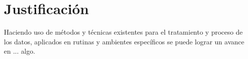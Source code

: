 \section{Justificación}

Haciendo uso de métodos y técnicas existentes para el tratamiento y proceso de los datos, aplicados en rutinas y ambientes específicos se puede lograr un avance en ... algo.
